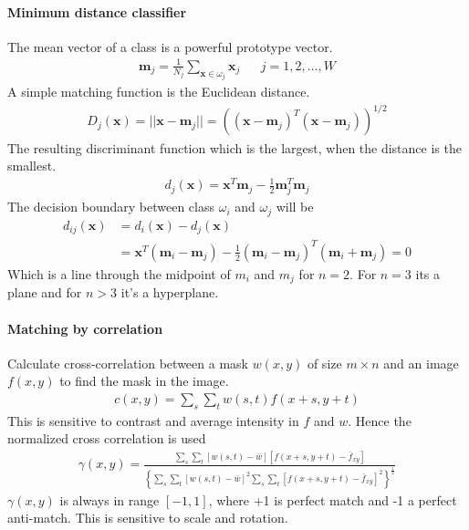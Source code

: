 \paragraph{Minimum distance classifier}
The mean vector of a class is a powerful prototype vector.
\begin{align*}
	\mathbf{m}_j = \frac{1}{N_j} \sum_{\mathbf{x} \in \omega_j}\mathbf{x}_j && j = 1,2,\dots, W
\end{align*}
A simple matching function is the Euclidean distance.
\begin{align*}
	D_j(\mathbf{x}) = ||\mathbf{x}-\mathbf{m}_j|| = \left((\mathbf{x}-\mathbf{m}_j)^T(\mathbf{x}-\mathbf{m}_j)\right)^{1/2}
\end{align*}
The resulting discriminant function which is the largest, when the distance is
the smallest.
\begin{align*}
	d_j(\mathbf{x}) = \mathbf{x}^T \mathbf{m}_j - \frac{1}{2}\mathbf{m}_j^T \mathbf{m}_j
\end{align*}
The decision boundary between class $\omega_i$ and $\omega_j$ will be
\begin{align*}
	d_{ij}(\mathbf{x}) &= d_i(\mathbf{x}) - d_j(\mathbf{x})\\
	&= \mathbf{x}^T(\mathbf{m}_i-\mathbf{m}_j) - \frac{1}{2}(\mathbf{m}_i-\mathbf{m}_j)^T(\mathbf{m}_i+\mathbf{m}_j) = 0
\end{align*}
Which is a line through the midpoint of $m_i$ and $m_j$ for $n=2$.
For $n=3$ its a plane and for $n>3$ it's a hyperplane.

\paragraph{Matching by correlation}
Calculate cross-correlation between a mask $w(x,y)$ of size $m\times n$ and an image
$f(x,y)$ to find the mask in the image.
\begin{align*}
	c(x,y) = \sum_s\sum_tw(s,t)f(x+s,y+t)
\end{align*}
This is sensitive to contrast and average intensity in $f$ and $w$.
Hence the normalized cross correlation is used
\begin{align*}
	\gamma(x,y) = \frac{\sum_s\sum_t\left[w(s,t)-\bar{w}\right]\left[f(x+s,y+t)-\bar f_{xy}\right]}
	{
	\left\lbrace
		\sum_s\sum_t\left[w(s,t)-\bar w\right]^2
		\sum_s\sum_t\left[f(x+s,y+t)-\bar f_{xy}\right]^2
	\right\rbrace^{\frac{1}{2}}
	}
\end{align*}
$\gamma(x,y)$ is always in range $[-1, 1]$, where +1 is perfect match and -1 a perfect anti-match.
This is sensitive to scale and rotation.

